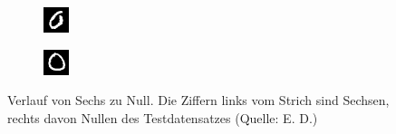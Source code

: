 \documentclass[
	a4paper,
	12pt,
	ngerman,
	oneside
]{scrreprt}											%
\begin{document}
\begin{figure}[h!]
\begin{subfigure}[h]{0.11\linewidth}
				\end{subfigure}
				\begin{subfigure}[h]{0.11\linewidth}
					\includegraphics[height=\linewidth]{imagesAndGraphData/6zu0/0-1533.png}
				\end{subfigure}
				\begin{subfigure}[h]{0.11\linewidth}
					\includegraphics[height=\linewidth]{imagesAndGraphData/6zu0/0-1271.png}
				\end{subfigure}
				
				\caption{Verlauf von Sechs zu Null. Die Ziffern links vom Strich sind Sechsen, rechts davon Nullen des Testdatensatzes (Quelle: E. D.)}\label{6zu0Beispiel}
			\end{figure}
	
\end{document}
